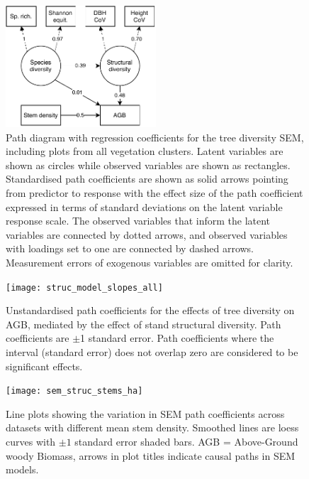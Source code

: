 \documentclass[11pt,a4paper]{article}
\begin{document}
\begin{figure}[H]
\centering
	\includegraphics[width=0.5\textwidth]{struc.drawio}
	\caption{Path diagram with regression coefficients for the tree diversity SEM, including plots from all vegetation clusters. Latent variables are shown as circles while observed variables are shown as rectangles. Standardised path coefficients are shown as solid arrows pointing from predictor to response with the effect size of the path coefficient expressed in terms of standard deviations on the latent variable response scale. The observed variables that inform the latent variables are connected by dotted arrows, and observed variables with loadings set to one are connected by dashed arrows. Measurement errors of exogenous variables are omitted for clarity.}
	\label{struc_mod}
\end{figure}
\newpage{}

\begin{figure}[H]
\centering
	\texttt{[image: struc\_model\_slopes\_all]}
	\caption{Unstandardised path coefficients for the effects of tree diversity on AGB, mediated by the effect of stand structural diversity. Path coefficients are $\pm$1 standard error. Path coefficients where the interval (standard error) does not overlap zero are considered to be significant effects.}
	\label{struc_model_slopes_all}
\end{figure}
\newpage{}

\begin{figure}[H]
\centering
	\texttt{[image: sem\_struc\_stems\_ha]}
	\caption{Line plots showing the variation in SEM path coefficients across datasets with different mean stem density. Smoothed lines are loess curves with $\pm1$ standard error shaded bars. AGB = Above-Ground woody Biomass, arrows in plot titles indicate causal paths in SEM models.}
	\label{sem_struc_stems_ha}
\end{figure}
\newpage{}
\end{document}
